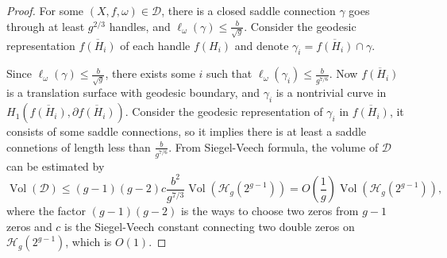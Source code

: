 \documentclass[10pt,a4paper]{amsart}
\renewcommand\H{{\mathcal H}}
\newcommand{\V}{\operatorname{Vol}}
\begin{document}
\begin{proof}
For some $(X,f,\omega)\in \mathcal{D}$, there is a closed saddle connection $\gamma$ goes through at least $g^{2/3}$ handles, and $\ell_\omega(\gamma)\leq \frac{b}{\sqrt{g}}$.
Consider the geodesic representation $\overline{f(H_i)}$ of each handle $f(H_i)$ and denote $\gamma_i=\overline{f(H_i)}\cap \gamma$.

Since $\ell_\omega(\gamma)\leq \frac{b}{\sqrt{g}}$, there exists some $i$ such that $\ell_\omega(\gamma_i)\leq\frac{b}{g^{7/6}}$.
Now $\overline{f(H_i)}$ is a translation surface with geodesic boundary, and $\gamma_i$ is a nontrivial curve in $H_1(\overline{f(H_i)},\partial{\overline{f(H_i)}})$.
Consider the geodesic representation of $\gamma_i$ in $\overline{f(H_i)}$, it consists of some saddle connections, so it implies there is at least a saddle connetions
of length less than $\frac{b}{g^{7/6}}$.
From Siegel-Veech formula, the volume of $\mathcal{D}$ can be estimated by
$$\V(\mathcal{D})\leq (g-1)(g-2)c \frac{b^2}{g^{7/3}} \V(\H_g(2^{g-1}))=O(\frac{1}{g})\V(\H_g(2^{g-1})),$$
where the factor $(g-1)(g-2)$ is the ways to choose two zeros from $g-1$ zeros and 
$c$ is the Siegel-Veech constant connecting two double zeros on $\H_g(2^{g-1})$, which
is $O(1)$.


\end{proof}
\end{document}
